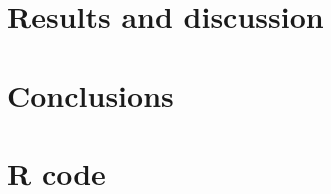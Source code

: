 \documentclass[
12pt, %
a4paper, %
oneside, %
headinclude,footinclude, %
BCOR5mm, %
]{scrartcl}
\begin{document}
\section{Results and discussion}

\clearpage

\section{Conclusions}

\clearpage

\section{R code}
\begin{lstlisting}


\end{lstlisting}




\renewcommand{\refname}{\spacedlowsmallcaps{References}} %




\end{document}
